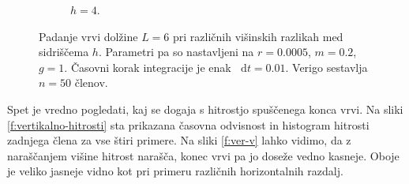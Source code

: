 \documentclass[a4paper, 12pt, slovene]{article}
\newcommand*\diff{\mathop{}\!\mathrm{d}}
\numberwithin{equation}{section}
\begin{document}
\begin{figure}[H]
\begin{subfigure}{0.415\textwidth}
	\caption{$h = 4$.}
	\label{f:ver-4}
\end{subfigure}
\caption{Padanje vrvi dolžine $L=6$ pri različnih višinskih razlikah med sidriščema $h$. Parametri pa so nastavljeni na $r=0.0005$, $m=0.2$, $g=1$. Časovni korak integracije je enak $\diff t = 0.01$. Verigo sestavlja $n=50$ členov.}
\label{f:vertikalno}
\end{figure}

Spet je vredno pogledati, kaj se dogaja s hitrostjo spuščenega konca vrvi. Na sliki \ref{f:vertikalno-hitrosti} sta prikazana časovna odvisnost in histogram hitrosti zadnjega člena za vse štiri primere. Na sliki \ref{f:ver-v} lahko vidimo, da z naraščanjem višine hitrost narašča, konec vrvi pa jo doseže vedno kasneje. Oboje je veliko jasneje vidno kot pri primeru različnih horizontalnih razdalj.
\end{document}
